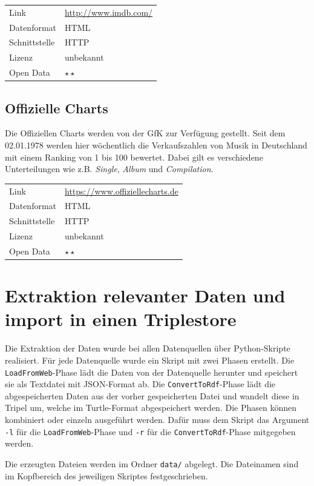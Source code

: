 \documentclass[parskip]{scrartcl}
\begin{document}
\begin{tabular}{l|p{9cm}}
	Link & \url{http://www.imdb.com/} \\
 	Datenformat & HTML \\
 	Schnittstelle & HTTP \\
 	Lizenz & unbekannt \\
 	Open Data & $\star\star$ \\
\end{tabular}

\subsection{Offizielle Charts}

Die Offiziellen Charts werden von der GfK zur Verfügung gestellt. Seit dem 02.01.1978 werden hier wöchentlich die Verkaufszahlen von Musik in Deutschland mit einem Ranking von 1 bis 100 bewertet. Dabei gilt es verschiedene Unterteilungen wie z.B. \textit{Single}, \textit{Album} und \textit{Compilation}.

\begin{tabular}{l|p{9cm}}
    Link & \url{https://www.offiziellecharts.de} \\
    Datenformat & HTML \\
    Schnittstelle & HTTP \\
    Lizenz & unbekannt \\
    Open Data & $\star\star$ \\
\end{tabular}

\section{Extraktion relevanter Daten und import in einen Triplestore }

Die Extraktion der Daten wurde bei allen Datenquellen über Python-Skripte realisiert. Für jede Datenquelle wurde ein Skript mit zwei Phasen erstellt. Die \texttt{LoadFromWeb}-Phase lädt die Daten von der Datenquelle herunter und speichert sie als Textdatei mit JSON-Format ab. Die \texttt{ConvertToRdf}-Phase lädt die abgespeicherten Daten aus der vorher gespeicherten Datei und wandelt diese in Tripel um, welche im Turtle-Format abgespeichert werden. Die Phasen können kombiniert oder einzeln ausgeführt werden. Dafür muss dem Skript das Argument \texttt{-l} für die \texttt{LoadFromWeb}-Phase und \texttt{-r} für die \texttt{ConvertToRdf}-Phase mitgegeben werden.

Die erzeugten Dateien werden im Ordner \texttt{data/} abgelegt. Die Dateinamen sind im Kopfbereich des jeweiligen Skriptes festgeschrieben.
\end{document}
